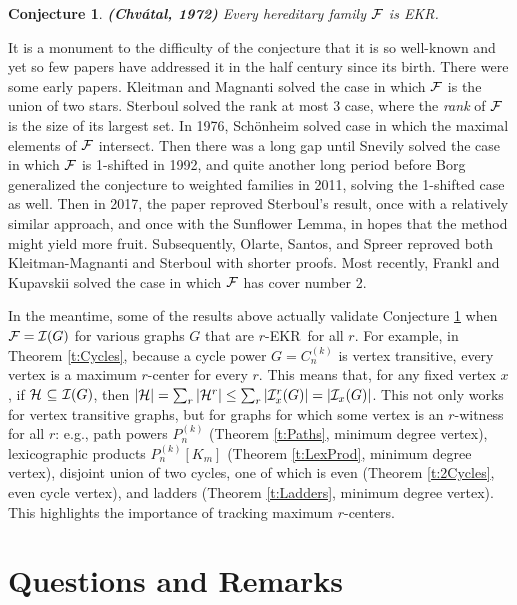 \documentclass{article}
\newtheorem{cnj}[thm]{Conjecture}
\def\cF{{\cal F}}
\def\cH{{\cal H}}
\def\cI{{\cal I}}
\def\ekr{{\sf EKR}}
\def\sse{{\subseteq}}
\begin{document}
\begin{cnj}
\label{j:Chvatal}
{\bf (Chv\'atal, 1972)}
Every hereditary family $\cF$ is \ekr.
\end{cnj}

It is a monument to the difficulty of the conjecture that it is so well-known and yet so few papers have addressed it in the half century since its birth.
There were some early papers.
Kleitman and Magnanti \cite{KleiMagn} solved the case in which $\cF$ is the union of two stars.
Sterboul \cite{Sterboul} solved the rank at most 3 case, where the {\it rank} of $\cF$ is the size of its largest set.
In 1976, Sch\"onheim \cite{Schonheim} solved case in which the maximal elements of $\cF$ intersect.
Then there was a long gap until Snevily \cite{Snevily} solved the case in which $\cF$ is 1-shifted in 1992, and quite another long period before Borg \cite{BorgChvatal} generalized the conjecture to weighted families in 2011, solving the 1-shifted case as well.
Then in 2017, the paper \cite{CzaHurKam} reproved Sterboul's result, once with a relatively similar approach, and once with the Sunflower Lemma, in hopes that the method might yield more fruit.
Subsequently, Olarte, Santos, and Spreer \cite{OlaSanSpr} reproved both Kleitman-Magnanti and Sterboul with shorter proofs.
Most recently, Frankl and Kupavskii \cite{FranKupaMatch} solved the case in which $\cF$ has cover number 2.

In the meantime, some of the results above actually validate Conjecture \ref{j:Chvatal} when $\cF=\cI(G)$ for various graphs $G$ that are $r$-\ekr\ for all $r$.
For example, in Theorem \ref{t:Cycles}, because a cycle power $G=C_n^{(k)}$ is vertex transitive, every vertex is a maximum $r$-center for every $r$.
This means that, for any fixed vertex $x$, if $\cH\ \sse\ \cI(G)$, then $|\cH| = \sum_r|\cH^r| \le \sum_r|\cI_x^r(G)| = |\cI_x(G)|$.
This not only works for vertex transitive graphs, but for graphs for which some vertex is an $r$-witness for all $r$: e.g., path powers $P_n^{(k)}$ (Theorem \ref{t:Paths}, minimum degree vertex), lexicographic products $P_n^{(k)}[K_m]$ (Theorem \ref{t:LexProd}, minimum degree vertex), disjoint union of two cycles, one of which is even (Theorem \ref{t:2Cycles}, even cycle vertex), and ladders (Theorem \ref{t:Ladders}, minimum degree vertex).
This highlights the importance of tracking maximum $r$-centers.


\section{Questions and Remarks}
\end{document}
